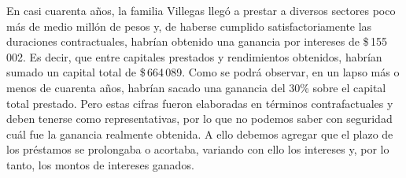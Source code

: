 \documentclass[14pt,twoside,final]{extbook} %
\begin{document}
En casi cuarenta años, la familia Villegas llegó a prestar a diversos sectores poco más de medio millón de pesos y, de haberse cumplido satisfactoriamente las duraciones contractuales, habrían obtenido una ganancia por intereses de \$\,155\,002. Es decir, que entre capitales prestados y rendimientos obtenidos, habrían sumado un capital total de \$\,664\,089. Como se podrá observar, en un lapso más o menos de cuarenta años, habrían sacado una ganancia del 30\% sobre el capital total prestado. Pero estas cifras fueron elaboradas en términos contrafactuales y deben tenerse como representativas, por lo que no podemos saber con seguridad cuál fue la ganancia realmente obtenida. A ello debemos agregar que el plazo de los préstamos se prolongaba o acortaba, variando con ello los intereses y, por lo tanto, los montos de intereses ganados.
\end{document}
